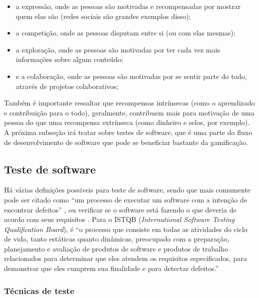 \documentclass[twoside,english,brazilian]{UNISINOSartigo}
\begin{document}

\begin{itemize}
	\item a expressão, onde as pessoas são motivadas e recompensadas por mostrar quem elas são (redes sociais são grandes exemplos disso);
	\item a competição, onde as pessoas disputam entre si (ou com elas mesmas);
	\item a exploração, onde as pessoas são motivadas por ter cada vez mais informações sobre algum conteúdo;
	\item e a colaboração, onde as pessoas são motivadas por se sentir parte do todo, através de projetos colaborativos;
\end{itemize}

Também é importante ressaltar que recompensas intrínsecas (como o aprendizado e contribuição para o todo), geralmente, contribuem mais para motivação de uma pessoa do que uma recompensa extrínseca (como dinheiro e selos, por exemplo). A próxima subseção irá tratar sobre testes de software, que é uma parte do fluxo de desenvolvimento de software que pode se beneficiar bastante da gamificação.


\subsection{Teste de software}

Há várias definições possíveis para teste de software, sendo que mais comumente pode ser citado como ``um processo de executar um software com a intenção de encontrar defeitos'' \cite{Myers-1979}, ou verificar se o software está fazendo o que deveria de acordo com seus requisitos \cite{RiosMoreira-2002}. Para o ISTQB (\textit{International Software Testing Qualification Board}), é ``o processo que consiste em todas as atividades do ciclo de vida, tanto estáticas quanto dinâmicas, preocupado com a preparação, planejamento e avaliação de produtos de software e produtos de trabalho relacionados para determinar que eles atendem os requisitos especificados, para demonstrar que eles cumprem sua finalidade e para detectar defeitos.'' \cite{ISTQB-Glos12}

\subsubsection{Técnicas de teste}
\end{document}
